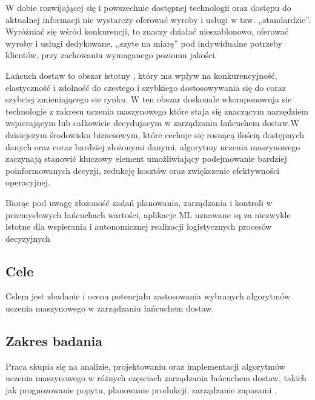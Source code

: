    W dobie rozwijającej się i powszechnie dostępnej technologii oraz 
dostępu do aktualnej informacji nie wystarczy oferować wyroby i usługi w tzw. ,,standardzie”. 
Wyróżniać się wśród konkurencji, to znaczy działać nieszablonowo, oferować wyroby i usługi 
dedykowane, ,,szyte na miarę” pod indywidualne potrzeby klientów, przy zachowaniu 
wymaganego poziomu jakości. \cite{Jozwiak2017}

    Łańcuch dostaw to obszar istotny , który ma wpływ na  konkurencyjność, elastyczność i zdolność do czestego i szybkiego dostosowywania się do coraz szybciej zmieniającego sie rynku. W ten obszar doskonale wkomponowuja sie  technologie z zakresu uczenia maszynowego które staja się znaczącym narzędziem wspierającym lub całkowicie decydujacym w zarządzaniu łańcuchem dostaw.W dzisiejszym środowisku biznesowym, które cechuje się rosnącą ilością dostępnych danych oraz coraz bardziej złożonymi danymi, algorytmy uczenia maszynowego zaczynają stanowić kluczowy element umożliwiający  podejmowanie bardziej poinformowanych decyzji, redukcję kosztów oraz zwiększenie efektywności operacyjnej.
    
    Biorąc pod uwagę złożoność zadań planowania, zarządzania i kontroli w przemysłowych łańcuchach wartości, aplikacje ML uznawane są za niezwykle istotne dla wspierania i autonomicznej realizacji logistycznych procesów decyzyjnych\cite{Weinke2023}
    
\subsection{Cele}
Celem jest zbadanie i ocena potencjału zastosowania wybranych algorytmów uczenia maszynowego w zarządzaniu łańcuchem dostaw. 
\subsection{Zakres badania}
Praca skupia się na analizie, projektowaniu oraz implementacji algorytmów uczenia maszynowego w różnych częsciach zarządzania łańcuchem dostaw, takich jak prognozowanie popytu, planowanie produkcji, zarządzanie zapasami .

